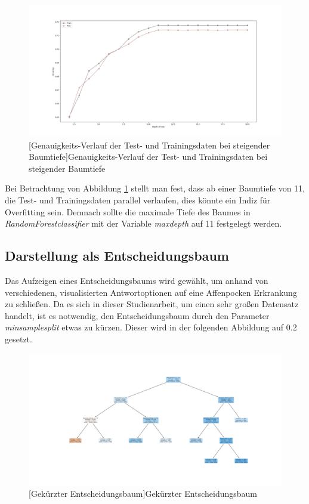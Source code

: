 \documentclass[13pt,a4paper, listof=entryprefix, bibliography=totocnumbered,toc=listofnumbered,lof=listofnumbered]{scrartcl}
\begin{document}
	\begin{figure}[H]
		\centering
		\includegraphics[width=0.8\linewidth]{Bilder/overfitting_plot.png}
		[Genauigkeits-Verlauf der Test- und Trainingsdaten bei steigender Baumtiefe]{Genauigkeits-Verlauf der Test- und Trainingsdaten bei steigender Baumtiefe}
		\label{fig:overfitting}
	\end{figure}

Bei Betrachtung von Abbildung \ref{fig:overfitting} stellt man fest, dass ab einer Baumtiefe von 11, die Test- und Trainingsdaten parallel 
verlaufen, dies könnte ein Indiz für Overfitting sein. Demnach sollte die maximale Tiefe des Baumes in
\textit{RandomForestclassifier} mit der Variable \textit{max\textunderscore depth} auf 11 festgelegt werden.  


	\subsection{Darstellung als Entscheidungsbaum}
		\label{ch:entscheidungsbaum}

Das Aufzeigen eines Entscheidungsbaums wird gewählt, um anhand von verschiedenen, visualisierten Antwortoptionen auf eine Affenpocken Erkrankung zu schließen.
Da es sich in dieser Studienarbeit, um einen sehr großen Datensatz handelt, ist es notwendig, den Entscheidungsbaum durch den Parameter \textit{min\textunderscore sample\textunderscore split}
etwas zu kürzen. Dieser wird in der folgenden Abbildung auf 0.2 gesetzt. 

	\begin{figure}[H]
		\centering
		\includegraphics[width=0.8\linewidth]{Bilder/decision_tree.png}
		[Gekürzter Entscheidungsbaum]{Gekürzter Entscheidungsbaum}
		\label{fig:decisiontree}
	\end{figure}
\end{document}
